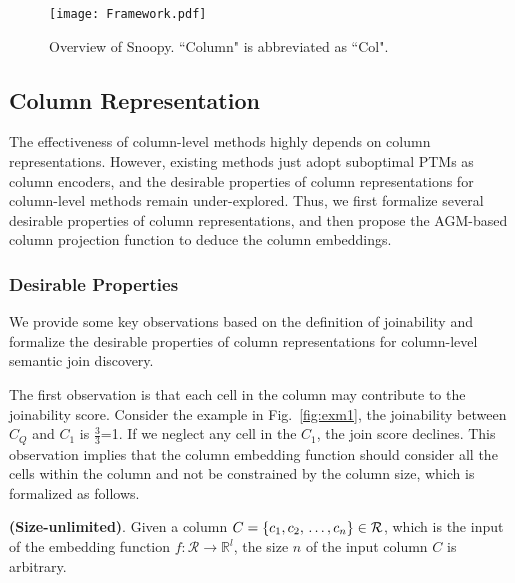 \begin{figure}
  \centering
  \texttt{[image: Framework.pdf]} \vspace{-4mm}
  \caption{Overview of \textsf{Snoopy}. ``Column" is abbreviated as ``Col".}
  \label{fig:framework}
  \vspace{-4mm}
\end{figure}

\subsection{Column Representation}
The effectiveness of column-level methods highly depends on column representations. However, existing methods just adopt suboptimal PTMs as column encoders, and the desirable properties of column representations for column-level methods remain under-explored. Thus, we first formalize several desirable properties of column representations, and then propose the AGM-based column projection function to deduce the column embeddings.

\subsubsection{Desirable Properties}
We provide some key observations based on the definition of joinability and formalize the desirable properties of column representations for column-level semantic join discovery.




The first observation is that each cell in the column may contribute to the joinability score. Consider the example in Fig.~\ref{fig:exm1}, the joinability between  $C_Q$ and $C_1$ is $\frac{3}{3}$=1. If we neglect any cell in the  $C_1$, the join score declines. 
This observation implies that the column embedding function should consider all the cells within the column and not be
constrained by the column size, which is formalized as follows.

 
\begin{myProp}
\label{prop:1}
 \textnormal{\textbf{(Size-unlimited)}.}
     Given a column $C =\{ c_1, c_2,\\ \dots, c_n \} \in \mathcal{R}$, which is the input of the embedding function $f: \mathcal{R} \rightarrow \mathbb{R}^l$, the size $n$ of the input column $C$ is arbitrary.
\end{myProp}


